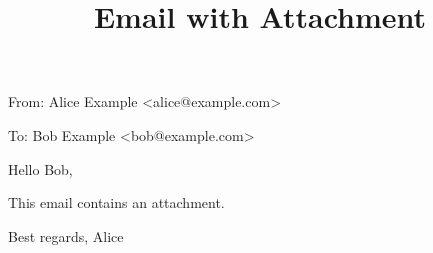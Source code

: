 \documentclass[11pt,a4paper]{article}
\title{Email with Attachment}
\begin{document}
\maketitle

From: Alice Example <alice@example.com>

To: Bob Example <bob@example.com>

Hello Bob,

This email contains an attachment.

Best regards,
Alice
\end{document}
